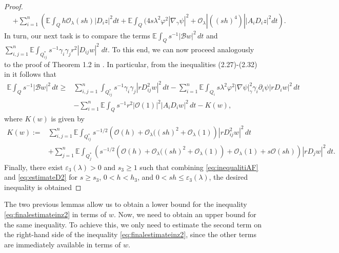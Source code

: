 \documentclass[11pt,oneside,leqno]{amsart}
\numberwithin{equation}{section}
\numberwithin{equation}{section}
\newcommand{\E}{\mathbb{E}}
\begin{document}
\begin{proof}
\begin{equation}
\begin{split}
        &+\sum_{i=1}^{n}\left(\E\int_{Q}h\mathcal{O}_{\lambda}(sh)|D_iz|^2dt+\E\int_{Q}(4s\lambda^2\varphi ^2|\nabla_\gamma\psi|^2+\mathcal{O}_{\lambda}|((sh)^4)||A_iD_iz|^2dt\right).
    \end{split}
\end{equation}
In turn, our next task is to compare the terms $\displaystyle \E\int_{Q}s^{-1}|\mathcal{B}w|^2\, dt$ and \\ $\displaystyle \sum_{i,j=1}^{n}\E\int_{Q_{ij}^{*}}s^{-1}\gamma_i\gamma_jr^2|D_{ij}w|^2\; dt$. To this end, we can now proceed analogously to the proof of Theorem 1.2 in \cite{LLRP:2025}. In particular, from the inequalities (2.27)-(2.32) in \cite{LLRP:2025} it follows that
\begin{equation}\label{eq:inequalitiAF}
    \begin{split}
        \E\int_{Q}s^{-1}|\mathcal{B}w|^2\,dt
        \geq & { \sum_{i,j=1}^{n}}\int_{Q_{ij}^{\ast}}s^{-1}\gamma_i\gamma_j|rD_{ij}^2w|^2\,dt-\sum_{i=1}^{n}\E\int_{Q_i}s\lambda^2\varphi^2|\nabla\psi|_{\gamma}^2\gamma_i\partial_i\psi|rD_iw|^2\,dt\\
    &-\sum_{i=1}^{n}\E \int_{Q}s^{-1}r^2|\mathcal{O}(1)|^2|A_iD_iw|^2\,dt-K(w),
    \end{split}
\end{equation}
where $K(w)$ is given by
\begin{align*}
    K(w):=&{ \sum_{i,j=1}^{n}}\E\int_{Q_{ij}^{\ast}}s^{-1/2}\left(\mathcal{O}(h)+\mathcal{O}_{\lambda}((sh)^2+\mathcal{O}_{\lambda}(1)\right)|rD_{ij}^2w|^2\,dt\\
    &+{ \sum_{j=1}^{n}}\E\int_{Q_j^{\ast}}\left(s^{-1/2}\left(\mathcal{O}(h)+\mathcal{O}_{\lambda}((sh)^2+\mathcal{O}_{\lambda}(1)\right)+\mathcal{O}_{\lambda}(1)+s\mathcal{O}(sh)\right)|rD_jw|^2\,dt.
\end{align*}
Finally, there exist $\varepsilon_3(\lambda)>0$ and $s_3\geq1$ such that combining \eqref{eq:inequalitiAF} and \eqref{eq:estimateD2} for $s\geq s_3$, $0<h<h_3$, and $0<sh\leq \varepsilon_3(\lambda)$, the desired inequality is obtained
\end{proof}
The two previous lemmas allow us to obtain a lower bound for the inequality \eqref{eq:finalestimateinz2} in terms of $w$. Now, we need to obtain an upper bound for the same inequality. To achieve this, we only need to estimate the second term on the right-hand side of the inequality \eqref{eq:finalestimateinz2}, since the other terms are immediately available in terms of $w$. 
\\
\end{document}
